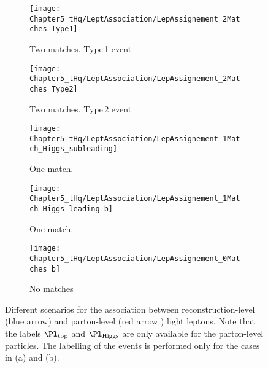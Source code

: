 \begin{figure}[h]
\centering
\begin{subfigure}{.49\textwidth}
  \centering
  \texttt{[image: Chapter5\_tHq/LeptAssociation/LepAssignement\_2Matches\_Type1]}
  \caption{Two matches. Type$\,$1 event}
  \label{fig:chap:tH:LepAssign:Match:Type1}
\end{subfigure} 
\begin{subfigure}{.49\textwidth}
  \centering
  \texttt{[image: Chapter5\_tHq/LeptAssociation/LepAssignement\_2Matches\_Type2]}
  \caption{Two matches. Type$\,$2 event}
  \label{fig:chap:tH:LepAssign:Match:Type2}
\end{subfigure}

\begin{subfigure}{.49\textwidth}
  \centering
  \texttt{[image: Chapter5\_tHq/LeptAssociation/LepAssignement\_1Match\_Higgs\_subleading]}
  \caption{One match.}
  \label{fig:chap:tH:LepAssign:Match:1Match}
\end{subfigure}\hfill
\begin{subfigure}{.49\textwidth}
  \centering
  \texttt{[image: Chapter5\_tHq/LeptAssociation/LepAssignement\_1Match\_Higgs\_leading\_b]}
  \caption{One match.}
  \label{fig:chap:tH:LepAssign:Match:1Match_b}
\end{subfigure}

\begin{subfigure}{.5\textwidth}
  \centering
  \texttt{[image: Chapter5\_tHq/LeptAssociation/LepAssignement\_0Matches\_b]}
  \caption{No matches}
  \label{fig:chap:tH:LepAssign:Match:0Matchs}
\end{subfigure}
\caption{	Different scenarios for the association between reconstruction-level (blue arrow) 
		and parton-level (red arrow ) light leptons. 
		Note that the labels $\Pl_{\text{top}}$ and $\Pl_{\text{Higgs}}$ are only available 
		for the parton-level particles. The labelling of the events is performed only for the 
		cases in (a) and (b).}%
\label{fig:chap:tH:LepAssign:Match}
\end{figure}


